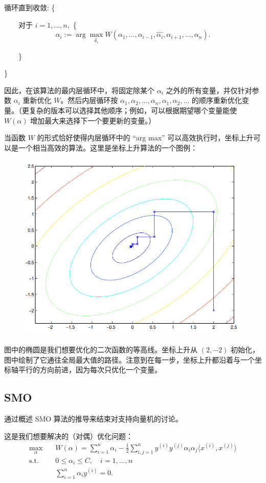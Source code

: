 循环直到收敛: \{

    $\quad\quad$对于 $i=1,\dots,n,$ \{
        \[
            \alpha_i := \arg\max_{\hat a_i} W(\alpha_1,\dots,\alpha_{i-1},\hat{\alpha_i},\alpha_{i+1},\dots,\alpha_n).
        \]
        
    $\quad\quad$\}

\}

因此，在该算法的最内层循环中，将固定除某个 $\alpha_i$ 之外的所有变量，并仅针对参数 $\alpha_i$ 重新优化 $W$。然后内层循环按 $\alpha_1, \alpha_2, \dots, \alpha_n, \alpha_1, \alpha_2, \dots$ 的顺序重新优化变量。（更复杂的版本可以选择其他顺序；例如，可以根据期望哪个变量能使 $W(\alpha)$ 增加最大来选择下一个要更新的变量。）

当函数 $W$ 的形式恰好使得内层循环中的 “arg max” 可以高效执行时，坐标上升可以是一个相当高效的算法。这里是坐标上升算法的一个图例：

\begin{figure}[H]
    \centering
    \includegraphics[width=0.5\linewidth]{figs/svm_coordinate_ascent.png}
\end{figure}


图中的椭圆是我们想要优化的二次函数的等高线。坐标上升从 $(2, -2)$ 初始化，图中绘制了它通往全局最大值的路径。注意到在每一步，坐标上升都沿着与一个坐标轴平行的方向前进，因为每次只优化一个变量。

\subsection{SMO}

通过概述 SMO 算法的推导来结束对支持向量机的讨论。

这是我们想要解决的（对偶）优化问题：
\begin{align}
    \max_\alpha \quad &W(\alpha) = \sum_{i=1}^n \alpha_i - \frac{1}{2} \sum_{i,j=1}^n y^{(i)} y^{(j)} \alpha_i \alpha_j \langle x^{(i)}, x^{(j)} \rangle \\
    \text{s.t.} \quad &0 \le \alpha_i \le C, \quad i=1,\dots,n \label{eq:6.20}\\
    &\sum_{i=1}^n \alpha_i y^{(i)} = 0. \label{eq:6.21}
\end{align}

